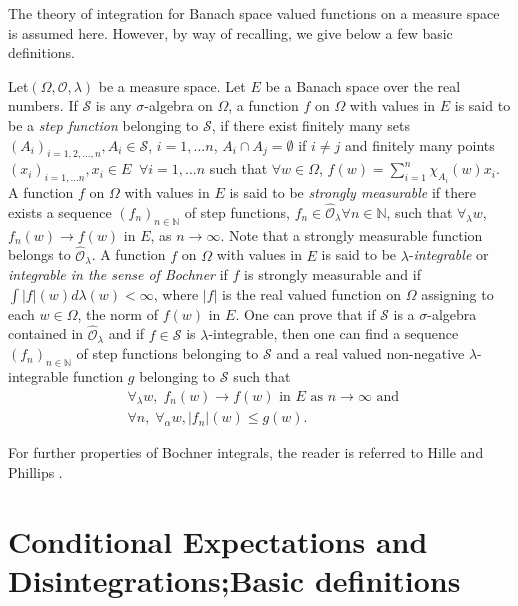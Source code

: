 The theory of integration for Banach space valued functions on a
measure space is assumed here. However, by way of recalling, we give
below a few basic definitions. 

Let\pageoriginale $(\Omega, \mathscr{O}, \lambda)$ be a measure
space. Let $E$ be a Banach space over the real numbers. If
$\mathcal{S}$ is any $\sigma$-algebra on $\Omega$, a function $f$ on
$\Omega$ with values in $E$ is said to be a \textit{step function}
belonging to $\mathcal{S}$, if there exist finitely many  sets
$(A_i)_{i=1,2,\ldots, n}, A_i \in \mathcal{S}$, $i = 1,\ldots n$,
$A_i \cap A_j = \emptyset$ if $i \neq j$ and finitely many points
$(x_i)_{i = 1,\ldots n}, x_i \in E \;\;  \forall i = 1, \ldots n$ such that
$\forall w \in\Omega$, $f(w) = \sum\limits^n_{i=1} \chi_{A_i}
(w)x_i$. A function $f$ on $\Omega$ with values in $E$ is said to be
\textit{strongly measurable} if there exists a sequence $(f_n)_{n\in
  \mathbb{N}}$ of step functions, $f_n \in\hat{\mathscr{O}}_\lambda
\forall n \in \mathbb{N}$, such that $\forall_\lambda w$, $f_n (w) \to
f(w)$ in $E$, as $n \to \infty$. Note that a strongly measurable
function belongs to $\hat{\mathscr{O}}_\lambda$. A function $f$ on
$\Omega$ with values in $E$ is said to be
$\lambda$-\textit{integrable} or \textit{integrable in the sense of
  Bochner} if $f$ is strongly measurable and if $\int|f| (w)
d\lambda(w) < \infty$, where $|f|$ is the real valued function on
$\Omega$ assigning to each $w \in \Omega$, the norm of $f(w)$ in
$E$. One can prove that if $\mathcal{S}$ is a $\sigma$-algebra
contained in $\hat{\mathscr{O}}_\lambda$ and if $f \in \mathcal{S}$
is $\lambda$-integrable, then one can find a sequence $(f_n)_{n \in
  \mathbb{N}}$ of step functions belonging to $\mathcal{S}$ and a
real valued non-negative $\lambda$-integrable function $g$ belonging
to $\mathcal{S}$ such that 
\begin{align*}
& \forall_\lambda w, \; f_n (w) \to f(w) \text{ in } E \text{ as } n
  \to \infty \text{ and }\\
& \forall n, \; \forall_\alpha w, |f_n| (w) \leq g (w). 
\end{align*}

For further properties of Bochner integrals, the reader is referred to
Hille and Phillips \cite{key1}. 

\section[Conditional Expectations and Disintegrations;...]{Conditional Expectations 
and Disintegrations;\hfil\break Basic definitions}\label{part1:chap1:sec3}

